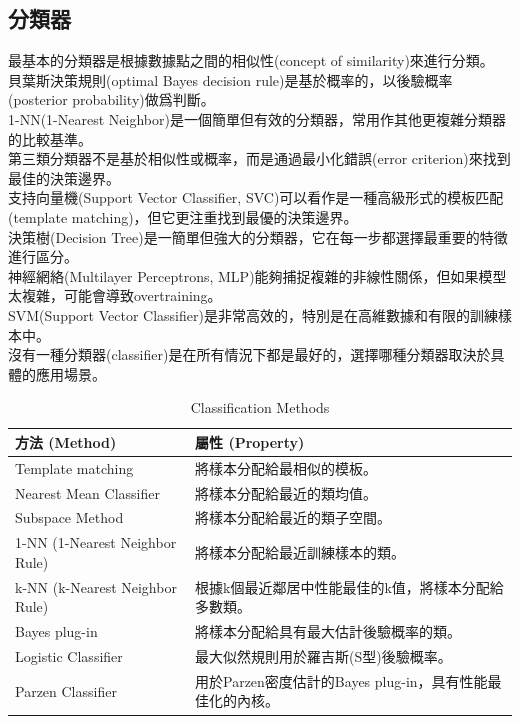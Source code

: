 \documentclass[10pt, a4paper]{article}
\begin{document}
\begin{CJK*}{UTF8}{bsmi}
\section{分類器}
最基本的分類器是根據數據點之間的相似性(concept of similarity)來進行分類。\\[0.5em]
貝葉斯決策規則(optimal Bayes decision rule)是基於概率的，以後驗概率(posterior probability)做爲判斷。\\[0.5em]
1-NN(1-Nearest Neighbor)是一個簡單但有效的分類器，常用作其他更複雜分類器的比較基準。\\[0.5em]
第三類分類器不是基於相似性或概率，而是通過最小化錯誤(error criterion)來找到最佳的決策邊界。\\[0.5em]
支持向量機(Support Vector Classifier, SVC)可以看作是一種高級形式的模板匹配(template matching)，但它更注重找到最優的決策邊界。\\[0.5em]
決策樹(Decision Tree)是一簡單但強大的分類器，它在每一步都選擇最重要的特徵進行區分。\\[0.5em]
神經網絡(Multilayer Perceptrons, MLP)能夠捕捉複雜的非線性關係，但如果模型太複雜，可能會導致overtraining。\\[0.5em]
SVM(Support Vector Classifier)是非常高效的，特別是在高維數據和有限的訓練樣本中。\\[0.5em]
沒有一種分類器(classifier)是在所有情況下都是最好的，選擇哪種分類器取決於具體的應用場景。\\[0.5em]
\begin{longtable}{| p{4.5cm} | p{10cm} |}
    \caption{Classification Methods} \\
    \hline
    方法 (Method) & 屬性 (Property) \\
    \hline
    \endfirsthead
    Template matching & 將樣本分配給最相似的模板。 \\
    \hline
    Nearest Mean Classifier & 將樣本分配給最近的類均值。 \\
    \hline
    Subspace Method & 將樣本分配給最近的類子空間。 \\
    \hline
    1-NN (1-Nearest Neighbor Rule) & 將樣本分配給最近訓練樣本的類。 \\
    \hline
    k-NN (k-Nearest Neighbor Rule) & 根據k個最近鄰居中性能最佳的k值，將樣本分配給多數類。 \\
    \hline
    Bayes plug-in & 將樣本分配給具有最大估計後驗概率的類。 \\
    \hline
    Logistic Classifier & 最大似然規則用於羅吉斯(S型)後驗概率。 \\
    \hline
    Parzen Classifier & 用於Parzen密度估計的Bayes plug-in，具有性能最佳化的內核。 \\

\end{longtable}
\end{CJK*}
\end{document}
